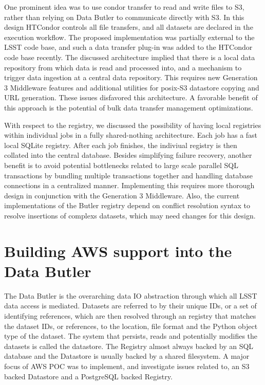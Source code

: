 One prominent idea was to use condor transfer to read and write files to S3, rather than relying on Data Butler to communicate directly with S3. In this design HTCondor controls all file transfers, and all datasets are declared in the execution workflow. The proposed implementation was partially external to the LSST code base, and such a data transfer plug-in was added to the HTCondor code base recently. The discussed architecture implied that there is a local data repository from which data is read and processed into, and a mechanism to trigger data ingestion at a central data repository. This requires new Generation 3 Middleware features and additional utilities for posix-S3 datastore copying and URL generation. These issues disfavored this architecture. A favorable benefit of this approach is the potential of bulk data transfer management optimizations.

With respect to the registry, we discussed the possibility of having local registries within individual jobs in a fully shared-nothing architecture.
Each job has a fast local SQLite registry.
After each job finishes, the indiviual registry is then collated into the central database.
Besides simplifying failure recovery, another benefit is to avoid potential bottlenecks related to large scale parallel SQL transactions by bundling multiple transactions together and handling database connections in a centralized manner.
Implementing this requires more thorough design in conjunction with the Generation 3 Middleware.
Also, the current implementations of the Butler registry depend on conflict resolution syntax to resolve insertions of complexs datasets, which may need changes for this design.


\section{Building AWS support into the Data Butler}
\label{sec:butler}

The Data Butler is the overarching data IO abstraction through which all LSST data access is mediated. Datasets are referred to by their unique IDs, or a set of identifying references, which are then resolved through an registry that matches the dataset IDs, or references, to the location, file format and the Python object type of the dataset. The system that persists, reads and potentially modifies the datasets is called the datastore. The Registry almost always backed by an SQL database and the Datastore is usually backed by a shared filesystem. A major focus of AWS POC was to implement, and investigate issues related to, an S3 backed Datastore and a PostgreSQL backed Registry.


